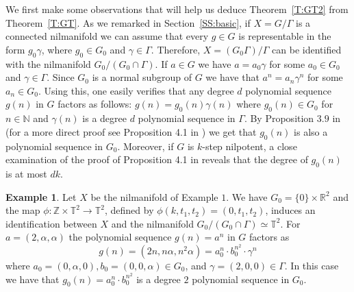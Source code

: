 \documentclass[11pt]{amsart}
\newcommand{\T}{\mathbb{T}}
\newcommand{\R}{\mathbb{R}}
\newcommand{\N}{\mathbb{N}}
\newcommand{\Z}{\mathbb{Z}}
\theoremstyle{plain}
\theoremstyle{definition}
\newtheorem{example}{Example}
\theoremstyle{remark}
\begin{document}
We first make some observations that will help us deduce
Theorem~\ref{T:GT2} from Theorem~\ref{T:GT}.  As we remarked in
Section~\ref{SS:basic}, if $X=G/\Gamma$ is a connected nilmanifold we
can assume that every $g\in G$ is representable in the form
$g_0\gamma$, where $g_0\in G_0$ and $\gamma\in \Gamma$. Therefore, $X=(G_0\Gamma)/\Gamma$ can be identified with the nilmanifold
$G_0/(G_0\cap \Gamma)$.
 If $a\in G$ we have
$a=a_0\gamma$ for some $a_0\in G_0$ and $\gamma\in \Gamma$. Since
$G_0$ is a normal subgroup of $G$ we have that $a^n=a_n\gamma^n$ for
some $a_n\in G_0$. Using this, one easily verifies that any degree $d$
polynomial sequence $g(n)$ in $G$ factors as follows:
$g(n)=g_0(n)\gamma(n)$ where $g_0(n)\in G_0$ for $n\in\N$ and
$\gamma(n)$ is a degree $d$ polynomial sequence in $\Gamma$. By
Proposition $3.9$ in \cite{L1} (for a more direct proof see
Proposition 4.1 in \cite{BLL}) we get that $g_0(n)$ is also a
polynomial sequence in $G_0$. Moreover, if $G$ is $k$-step nilpotent,
a close examination of the proof of Proposition 4.1 in \cite{BLL}
reveals that the degree of $g_0(n)$ is at most $dk$.
\begin{example}
  Let $X$ be the nilmanifold of Example $1$. We have $G_0=\{0\}\times
  \R^2$ and the map $\phi\colon \Z\times \T^2\to \T^2$, defined by
  $\phi(k,t_1,t_2)=(0,t_1,t_2)$, induces an identification between $X$
  and the nilmanifold $G_0/(G_0\cap \Gamma) \simeq \T^2$. For
  $a=(2,\alpha,\alpha)$ the polynomial sequence $g(n)=a^n$ in $G$
  factors as
$$
g(n)=(2n, n\alpha,n^2\alpha)=a_0^n \cdot b_0^{n^2}\cdot \gamma^n
$$
where $a_0=(0,\alpha,0), b_0=(0,0,\alpha)\in G_0$, and
$\gamma=(2,0,0)\in \Gamma$.  In this case we have that $g_0(n)=a_0^n
\cdot b_0^{n^2}$ is a degree $2$ polynomial sequence in $G_0$.
\end{example}
\end{document}
